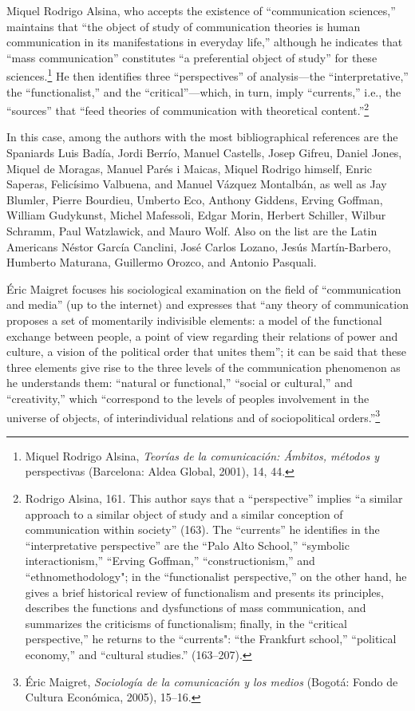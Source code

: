 \documentclass{tufte-handout}
\begin{document}
Miquel Rodrigo Alsina, who accepts the existence of ``communication
sciences,'' maintains that ``the object of study of communication
theories is human communication in its manifestations in everyday
life,'' although he indicates that ``mass communication'' constitutes
``a preferential object of study'' for these sciences.\footnote{Miquel
  Rodrigo Alsina, \emph{Teorías de la comunicación: Ámbitos, métodos y}
  perspectivas (Barcelona: Aldea Global, 2001), 14, 44.} He then
identifies three ``perspectives'' of analysis---the ``interpretative,''
the ``functionalist,'' and the ``critical''---which, in turn, imply
``currents,'' i.e., the ``sources'' that ``feed theories of
communication with theoretical content.''\footnote{Rodrigo Alsina, 161.
  This author says that a ``perspective'' implies ``a similar approach
  to a similar object of study and a similar conception of communication
  within society'' (163). The ``currents'' he identifies in the
  ``interpretative perspective'' are the ``Palo Alto School,''
  ``symbolic interactionism,'' ``Erving Goffman,'' ``constructionism,''
  and ``ethnomethodology"; in the ``functionalist perspective,'' on the
  other hand, he gives a brief historical review of functionalism and
  presents its principles, describes the functions and dysfunctions of
  mass communication, and summarizes the criticisms of functionalism;
  finally, in the ``critical perspective,'' he returns to the
  ``currents": ``the Frankfurt school,'' ``political economy,'' and
  ``cultural studies.'' (163--207).}

In this case, among the authors with the most bibliographical references
are the Spaniards Luis Badía, Jordi Berrío, Manuel Castells, Josep
Gifreu, Daniel Jones, Miquel de Moragas, Manuel Parés i Maicas, Miquel
Rodrigo himself, Enric Saperas, Felicísimo Valbuena, and Manuel Vázquez
Montalbán, as well as Jay Blumler, Pierre Bourdieu, Umberto Eco, Anthony
Giddens, Erving Goffman, William Gudykunst, Michel Mafessoli, Edgar
Morin, Herbert Schiller, Wilbur Schramm, Paul Watzlawick, and Mauro
Wolf. Also on the list are the Latin Americans Néstor García Canclini,
José Carlos Lozano, Jesús Martín-Barbero, Humberto Maturana, Guillermo
Orozco, and Antonio Pasquali.

Éric Maigret focuses his sociological examination on the field of
``communication and media'' (up to the internet) and expresses that
``any theory of communication proposes a set of momentarily indivisible
elements: a model of the functional exchange between people, a point of
view regarding their relations of power and culture, a vision of the
political order that unites them''; it can be said that these three
elements give rise to the three levels of the communication phenomenon
as he understands them: ``natural or functional,'' ``social or
cultural,'' and ``creativity,'' which ``correspond to the levels of
people\textquotesingle s involvement in the universe of objects, of
interindividual relations and of sociopolitical orders.''\footnote{Éric
  Maigret, \emph{Sociología de la comunicación y los medios} (Bogotá:
  Fondo de Cultura Económica, 2005), 15--16.}
\end{document}
